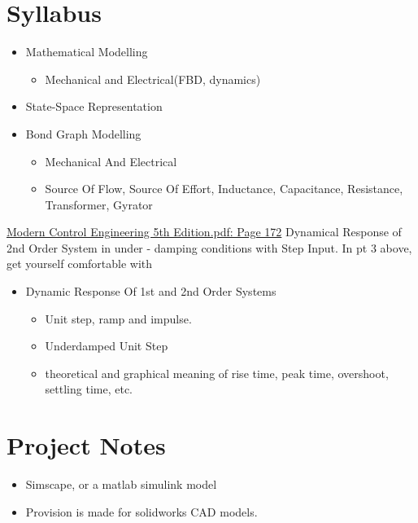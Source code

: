 \documentclass[11pt]{report}
\begin{document}
\part{Syllabus}
\label{sec:org7b37087}

\begin{itemize}
\item Mathematical Modelling
\begin{itemize}
\item Mechanical and Electrical(FBD, dynamics)
\end{itemize}
\item State-Space Representation
\item Bond Graph Modelling
\begin{itemize}
\item Mechanical And Electrical
\item Source Of Flow, Source Of Effort, Inductance, Capacitance, Resistance, Transformer, Gyrator
\end{itemize}
\end{itemize}

\href{file:///home/adithya/university-notes/Modelling, Simulation And Analysis/textbooks/Modern Control Engineering 5th Edition.pdf}{Modern Control Engineering 5th Edition.pdf: Page 172}
Dynamical Response of 2nd Order System in under - damping conditions with Step Input.
In pt 3 above, get yourself comfortable with
\begin{itemize}
\item Dynamic Response Of 1st and 2nd Order Systems
\begin{itemize}
\item Unit step, ramp and impulse.
\item Underdamped Unit Step
\item theoretical and graphical meaning of rise time, peak time, overshoot, settling time, etc.
\end{itemize}
\end{itemize}
\part{Project Notes}
\label{sec:org269aea6}
\begin{itemize}
\item Simscape, or a matlab simulink model
\item Provision is made for solidworks CAD models.
\end{itemize}
\end{document}
